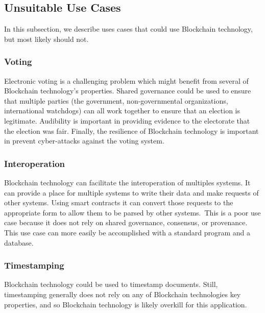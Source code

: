 \subsection{Unsuitable Use Cases}
In this subsection, we describe uses cases that could use Blockchain technology, but most likely should not.

\subsubsection{Voting}
Electronic voting is a challenging problem which might benefit from several of Blockchain technology's properties.
Shared governance could be used to ensure that multiple parties (the government, non-governmental organizations, international watchdogs) can all work together to ensure that an election is legitimate.
Audibility is important in providing evidence to the electorate that the election was fair.
Finally, the resilience of Blockchain technology is important in prevent cyber-attacks against the voting system.

\subsubsection{Interoperation}
Blockchain technology can facilitate the interoperation of multiples systems.
It can provide a place for multiple systems to write their data and make requests of other systems.
Using smart contracts it can convert those requests to the appropriate form to allow them to be parsed by other systems.\
This is a poor use case because it does not rely on shared governance, consensus, or provenance.
This use case can more easily be accomplished with a standard program and a database.



\subsubsection{Timestamping}
Blockchain technology could be used to timestamp documents. Still, timestamping generally does not rely on any of Blockchain technologies key properties, and so Blockchain technology is likely overkill for this application.